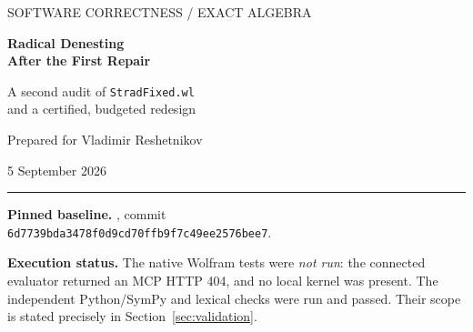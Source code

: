 \documentclass[11pt,letterpaper]{article}
\newcommand{\code}[1]{\texttt{\detokenize{#1}}}
\theoremstyle{definition}
\theoremstyle{remark}
\newcommand{\baselinecommit}{\texttt{6d7739bda3478f0d9cd70ffb9f7c49ee2576bee7}}
\begin{document}
\begin{titlepage}
\vspace*{0.4in}
{\small\color{accent}\sffamily SOFTWARE CORRECTNESS \quad / \quad EXACT ALGEBRA}\par
\vspace{0.35in}
{\Huge\bfseries Radical Denesting\\[5pt]After the First Repair\par}
\vspace{0.22in}
{\Large A second audit of \texttt{StradFixed.wl}\\[4pt]
and a certified, budgeted redesign\par}
\vspace{0.3in}
{\large Prepared for Vladimir Reshetnikov\par}
{\large 5 September 2026\par}
\vspace{0.3in}
\noindent\color{rulegray}\rule{\textwidth}{0.8pt}\color{black}
\begin{abstract}
The corrected denester in the \emph{RadicalDenest} repository is substantially safer than its predecessor: in particular, its multiplier engine checks proposed answers against the original target, rather than a moving intermediate target. Nevertheless, its advertised guarantees are broader than the implementation supports. A user-supplied solver can replace a numerical radical inside a symbolic host without local certification; effective option defaults are not consistently propagated; expensive algebraic operations and combinatorial generation escape the intended search budget; and the multiplier-cap calculation still admits oversized batches. A separate failure-path defect arises because a failed minimal-polynomial computation can be mistaken for a constant polynomial by a public rationalization helper.

This article separates demonstrated source-level consequences, mathematical counterexamples, proof gaps, and remaining engineering risks. It derives the algebra behind the multiplier search and several useful exact fast paths, corrects two claims in the earlier improvement plan, and presents a proposed Wolfram Language replacement with local equality gates, explicit resource boundaries, a finite multiplier queue, and structured diagnostics. The accompanying package includes native regression tests and independently executed exact mathematical checks. Neither unrestricted completeness nor native-tested production readiness is claimed.
\end{abstract}
\vfill
\noindent\textbf{Pinned baseline.} \code{VladimirReshetnikov/RadicalDenest}, commit\\
\baselinecommit.\par
\smallskip
\noindent\textbf{Execution status.} The native Wolfram tests were \emph{not run}: the connected evaluator returned an MCP HTTP 404, and no local kernel was present. The independent Python/SymPy and lexical checks were run and passed. Their scope is stated precisely in Section~\ref{sec:validation}.
\end{titlepage}
\end{document}
